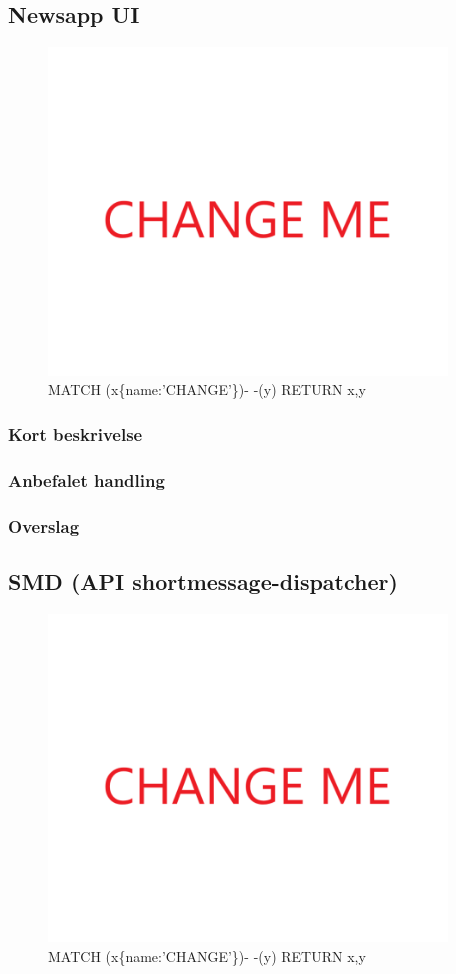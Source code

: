 \documentclass{article}
\begin{document}
\subsection{Newsapp UI}
\begin{figure}[h]
\includegraphics[width=300pt]{CHANGE.PNG}
\caption{MATCH (x\{name:'CHANGE'\})- -(y) RETURN x,y}
\end{figure}
\subsubsection{Kort beskrivelse}
\subsubsection{Anbefalet handling}
\subsubsection{Overslag}
\subsection{SMD (API shortmessage-dispatcher)}
\begin{figure}[h]
\includegraphics[width=300pt]{CHANGE.PNG}
\caption{MATCH (x\{name:'CHANGE'\})- -(y) RETURN x,y}
\end{figure}
\end{document}
